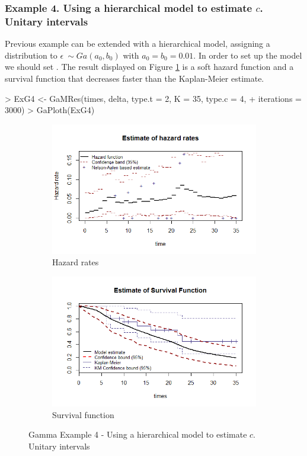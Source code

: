 \documentclass[letterpaper]{article}
\begin{document}
\subsubsection{Example 4. Using a hierarchical model to estimate $c$. Unitary intervals}

Previous example can be extended with a hierarchical model, assigning a distribution to $\epsilon ~ \sim Ga(a_0,b_0)$ with $a_0=b_0=0.01$. In order to set up the model we should set . The result displayed on Figure \ref{fig:G4} is a soft hazard function and a survival function that decreases faster than the Kaplan-Meier estimate.

\begin{Schunk}
\begin{Sinput}
> ExG4 <- GaMRes(times, delta, type.t = 2, K = 35, type.c = 4, 
+                iterations = 3000)
> GaPloth(ExG4)
\end{Sinput}
\end{Schunk}

\begin{figure}
  \centering
  \begin{subfigure}[a]{\textwidth}\centering
    \includegraphics[width=\textwidth]{G41.png}
    \caption{Hazard rates}
  \end{subfigure}
  \begin{subfigure}[b]{\textwidth}\centering
    \includegraphics[width=\textwidth]{G42.png}
    \caption{Survival function}
  \end{subfigure}
  \caption{Gamma Example 4 - Using a hierarchical model to estimate $c$. Unitary intervals}
  \label{fig:G4}
\end{figure}
\end{document}

